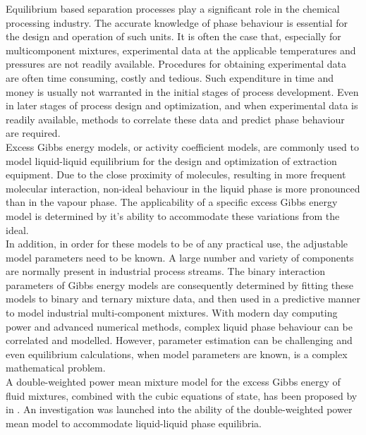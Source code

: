                                                                                                                                            
Equilibrium based separation processes play a significant role in the chemical processing industry. The accurate knowledge of phase behaviour is essential for the design and operation of such units. It is often the case that, especially for multicomponent mixtures, experimental data at the applicable temperatures and pressures are not readily available. Procedures for obtaining experimental data are often time consuming, costly and tedious. Such expenditure in time and money is usually not warranted in the initial stages of process development. Even in later stages of process design and optimization, and when experimental data is readily available, methods to correlate these data and predict phase behaviour are required.\\

Excess Gibbs energy models, or activity coefficient models, are commonly used to model liquid-liquid equilibrium for the design and optimization of extraction equipment. Due to the close proximity of molecules, resulting in more frequent molecular interaction, non-ideal behaviour in the liquid phase is more pronounced than in the vapour phase. The applicability of a specific excess Gibbs energy model is determined by it's ability to accommodate these variations from the ideal.\\

In addition, in order for these models to be of any practical use, the adjustable model parameters need to be known. A large number and variety of components are normally present in industrial process streams. The binary interaction parameters of Gibbs energy models are consequently determined by fitting these models to binary and ternary mixture data, and then used in a predictive manner to model industrial multi-component mixtures. With modern day computing power and advanced numerical methods, complex liquid phase behaviour can be correlated and modelled. However, parameter estimation can be challenging and even equilibrium calculations, when model parameters are known, is a complex mathematical problem.\\ 

A double-weighted power mean mixture model for the excess Gibbs energy of fluid mixtures, combined with the cubic equations of state, has been proposed by \citeauthor{WeightedPowerMeanModel} in \citeyear{WeightedPowerMeanModel}. An investigation was launched into the ability of the double-weighted power mean model to accommodate liquid-liquid phase equilibria.\\


